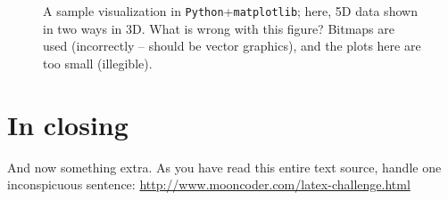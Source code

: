 \documentclass{article}
\begin{document}
\begin{figure}
\begin{center}
\end{center}
\caption{A sample visualization in \texttt{Python}+\texttt{matplotlib}; here, 5D data shown in two ways in 3D. What is wrong with this figure? Bitmaps are used (incorrectly -- should be vector graphics), and the plots here are too small (illegible).}
\label{fig:matplotlib}
\end{figure}

\clearpage %





\section{In closing}

And now something extra. As you have read this entire text source, handle one inconspicuous sentence: \url{http://www.mooncoder.com/latex-challenge.html} %





\end{document}
